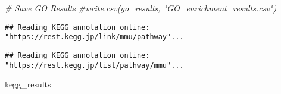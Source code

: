 \documentclass[
]{article}
\newenvironment{Shaded}{\begin{snugshade}}{\end{snugshade}}
\newcommand{\AttributeTok}[1]{\textcolor[rgb]{0.13,0.29,0.53}{#1}}
\newcommand{\CommentTok}[1]{\textcolor[rgb]{0.56,0.35,0.01}{\textit{#1}}}
\newcommand{\FunctionTok}[1]{\textcolor[rgb]{0.13,0.29,0.53}{\textbf{#1}}}
\newcommand{\NormalTok}[1]{#1}
\newcommand{\OtherTok}[1]{\textcolor[rgb]{0.56,0.35,0.01}{#1}}
\newcommand{\SpecialCharTok}[1]{\textcolor[rgb]{0.81,0.36,0.00}{\textbf{#1}}}
\newcommand{\StringTok}[1]{\textcolor[rgb]{0.31,0.60,0.02}{#1}}
\begin{document}
\begin{Shaded}
\begin{Highlighting}[]
\CommentTok{\# Save GO Results}
\CommentTok{\#write.csv(go\_results, "GO\_enrichment\_results.csv")}
\end{Highlighting}
\end{Shaded}

\begin{Shaded}
\end{Shaded}

\begin{verbatim}
## Reading KEGG annotation online: "https://rest.kegg.jp/link/mmu/pathway"...
\end{verbatim}

\begin{verbatim}
## Reading KEGG annotation online: "https://rest.kegg.jp/list/pathway/mmu"...
\end{verbatim}

\begin{Shaded}
\begin{Highlighting}[]
\NormalTok{kegg\_results}
\end{Highlighting}
\end{Shaded}
\end{document}
